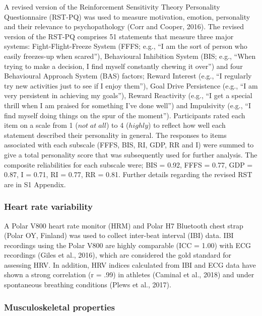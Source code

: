 \documentclass[
  english,
  man,floatsintext]{apa6}
\begin{document}
A revised version of the Reinforcement Sensitivity Theory Personality Questionnaire (RST-PQ) was used to measure motivation, emotion, personality and their relevance to psychopathology (Corr and Cooper, 2016).
The revised version of the RST-PQ comprises 51 statements that measure three major systems: Fight-Flight-Freeze System (FFFS; e.g., ``I am the sort of person who easily freezes-up when scared''), Behavioural Inhibition System (BIS; e.g., ``When trying to make a decision, I find myself constantly chewing it over'') and four Behavioural Approach System (BAS) factors; Reward Interest (e.g., ``I regularly try new activities just to see if I enjoy them''), Goal Drive Persistence (e.g., ``I am very persistent in achieving my goals''), Reward Reactivity (e.g., ``I get a special thrill when I am praised for something I've done well'') and Impulsivity (e.g., ``I find myself doing things on the spur of the moment'').
Participants rated each item on a scale from 1 (\(not\; at\; all\)) to 4 (\(highly\)) to reflect how well each statement described their personality in general.
The responses to items associated with each subscale (FFFS, BIS, RI, GDP, RR and I) were summed to give a total personality score that was subsequently used for further analysis.
The composite reliabilities for each subscale were; BIS = 0.92, FFFS = 0.77, GDP = 0.87, I = 0.71, RI = 0.77, RR = 0.81. Further details regarding the revised RST are in S1 Appendix.

\hypertarget{heart-rate-variability}{%
\subsubsection{Heart rate variability}\label{heart-rate-variability}}

A Polar V800 heart rate monitor (HRM) and Polar H7 Bluetooth chest strap (Polar OY, Finland) was used to collect inter-beat interval (IBI) data.
IBI recordings using the Polar V800 are highly comparable (ICC = 1.00) with ECG recordings (Giles et al., 2016), which are considered the gold standard for assessing HRV.
In addition, HRV indices calculated from IBI and ECG data have shown a strong correlation (r = .99) in athletes (Caminal et al., 2018) and under spontaneous breathing conditions (Plews et al., 2017).

\hypertarget{musculoskeletal-properties}{%
\subsubsection{Musculoskeletal properties}\label{musculoskeletal-properties}}
\end{document}
